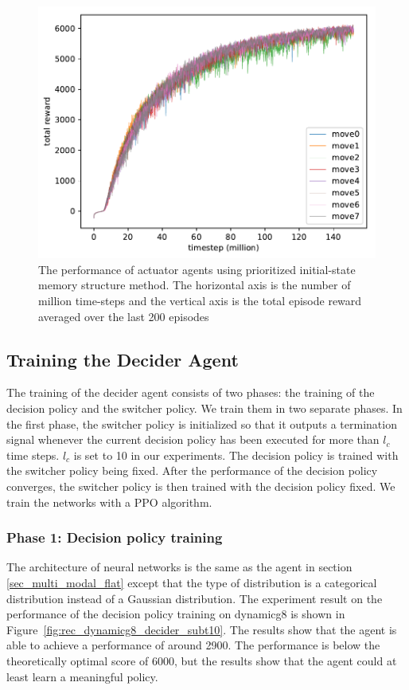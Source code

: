\begin{figure}[!htbp]
	\includegraphics[width=\textwidth]{images/rec_180811_randomsave}
	\centering
	\caption{The performance of actuator agents using prioritized initial-state memory structure method. The horizontal axis is the number of million time-steps and the vertical axis is the total episode reward averaged over the last 200 episodes}\label{rec_randomsave}
\end{figure}

\subsection{Training the Decider Agent}
The training of the decider agent consists of two phases: the training of the decision policy and the switcher policy. We train them in two separate phases. In the first phase, the switcher policy is initialized so that it outputs a termination signal whenever the current decision policy has been executed for more than $l_c$ time steps. $l_c$  is set to 10 in our experiments. The decision policy is trained with the switcher policy being fixed. After the performance of the decision policy converges, the switcher policy is then trained with the decision policy fixed. We train the networks with a PPO algorithm.

\subsubsection{Phase 1: Decision policy training}
The architecture of neural networks is the same as the agent in section \ref{sec_multi_modal_flat} except that the type of distribution is a categorical distribution instead of a Gaussian distribution.
The experiment result on the performance of the decision policy training on dynamicg8 is shown in Figure~\ref{fig:rec_dynamicg8_decider_subt10}. The results show that the agent is able to achieve a performance of around 2900. The performance is below the theoretically optimal score of 6000, but the results show that the agent could at least learn a meaningful policy.

